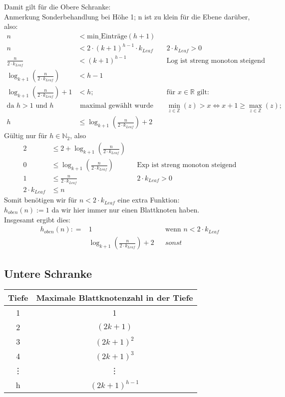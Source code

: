 \begin{note}
Damit gilt für die Obere Schranke:\\
Anmerkung Sonderbehandlung bei Höhe 1;
n ist zu klein für die Ebene darüber, also:
\begin{align*}
n&< \textrm{min\_Einträge}(h+1)\\
n&< 2\cdot(k+1)^{h-1}\cdot k_{Leaf} && 2\cdot k_{Leaf}>0\\
\frac{n}{2\cdot k_{Leaf}} &< (k+1)^{h-1} && \textrm{Log ist streng monoton steigend}\\
\log_{k+1} (\frac{n}{2\cdot k_{Leaf}}) &< h-1\\
\log_{k+1} (\frac{n}{2\cdot k_{Leaf}}) +1 &<h; && \textrm{für $x\in{\mathbb{R}}$ gilt:} \\
\textrm{da } h>1 \textrm{ und }h&\textrm{ maximal gewählt wurde}  && \min_{z\in\mathbb{Z}} (z) > x\Leftrightarrow x+1 \geq\max_{z\in\mathbb{Z}}(z);\\
h&\leq \log_{k+1}(\frac{n}{2\cdot k_{Leaf}}) +2
\end{align*}
Gültig nur für $h\in\mathbb{N}_2$, also
\begin{align*}
2&\leq 2+\log_{k+1}(\frac{n}{2\cdot k_{Leaf}})\\
0&\leq \log_{k+1} (\frac{n}{2\cdot k_{Leaf}}) && \textrm{Exp ist streng monoton steigend}\\
1&\leq \frac{n}{2\cdot k_{Leaf}} && 2\cdot k_{Leaf}>0\\
2\cdot k_{Leaf}&\leq n
\end{align*}
Somit benötigen wir für $n<2\cdot k_{Leaf}$ eine extra Funktion:\\
$h_{oben}(n):=1$ da wir hier immer nur einen Blattknoten haben.\\
Insgesamt ergibt dies:\\
\begin{align*}
h_{oben}(n): =  &1& &\textrm{wenn }n<2\cdot k_{Leaf}\\
 &\log_{k+1}(\frac{n}{2\cdot k_{Leaf}})+2& & sonst
\end{align*}
\subsection*{Untere Schranke}
\begin{tabular}{cc}
	Tiefe & Maximale Blattknotenzahl in der Tiefe \\
	\hline
	1 & 1 \\
	\hline
	2 & $(2k+1)$ \\
	\hline
	3 & $(2k+1)^2$ \\
	\hline
	4 & $(2k+1)^3$ \\
	\hline
	\vdots & \vdots \\
	\hline
	h & $(2k+1)^{h-1}$ \\
	\hline
\end{tabular}


\end{note}
